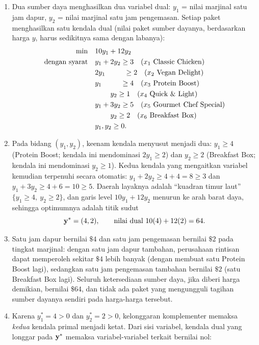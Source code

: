 \begin{enumerate}
\item Dua sumber daya menghasilkan dua variabel dual: $y_1$ = nilai marjinal satu jam dapur, $y_2$ = nilai marjinal satu jam pengemasan. Setiap paket menghasilkan satu kendala dual (nilai paket sumber dayanya, berdasarkan harga $y$, harus sedikitnya sama dengan labanya):
\[
\begin{aligned}
\min \quad & 10y_1 + 12y_2 \\
\st & y_1 + 2y_2 \ge 3 \quad (x_1 \text{ Classic Chicken}) \\
& 2y_1 \phantom{{}+2y_2} \ge 2 \quad (x_2 \text{ Vegan Delight}) \\
& y_1 \phantom{{}+2y_2} \ge 4 \quad (x_3 \text{ Protein Boost}) \\
& \phantom{y_1 + {}} y_2 \ge 1 \quad (x_4 \text{ Quick \& Light}) \\
& y_1 + 3y_2 \ge 5 \quad (x_5 \text{ Gourmet Chef Special}) \\
& \phantom{y_1 + {}} y_2 \ge 2 \quad (x_6 \text{ Breakfast Box}) \\
& y_1, y_2 \ge 0 .
\end{aligned}
\]
\item Pada bidang $(y_1, y_2)$, keenam kendala menyusut menjadi dua: $y_1 \ge 4$ (Protein Boost; kendala ini mendominasi $2y_1 \ge 2$) dan $y_2 \ge 2$ (Breakfast Box; kendala ini mendominasi $y_2 \ge 1$). Kedua kendala yang mengaitkan variabel kemudian terpenuhi secara otomatis: $y_1 + 2y_2 \ge 4 + 4 = 8 \ge 3$ dan $y_1 + 3y_2 \ge 4 + 6 = 10 \ge 5$. Daerah layaknya adalah ``kuadran timur laut'' $\{y_1 \ge 4,\ y_2 \ge 2\}$, dan garis level $10y_1 + 12y_2$ menurun ke arah barat daya, sehingga optimumnya adalah titik sudut
\[
\mathbf{y}^* = (4, 2), \qquad \mbox{nilai dual } 10(4) + 12(2) = 64 .
\]
\item Satu jam dapur bernilai $\$4$ dan satu jam pengemasan bernilai $\$2$ pada tingkat marjinal: dengan satu jam dapur tambahan, perusahaan rintisan dapat memperoleh sekitar $\$4$ lebih banyak (dengan membuat satu Protein Boost lagi), sedangkan satu jam pengemasan tambahan bernilai $\$2$ (satu Breakfast Box lagi). Seluruh ketersediaan sumber daya, jika diberi harga demikian, bernilai $\$64$, dan tidak ada paket yang mengungguli tagihan sumber dayanya sendiri pada harga-harga tersebut.
\item Karena $y_1^* = 4 > 0$ dan $y_2^* = 2 > 0$, kelonggaran komplementer memaksa \emph{kedua} kendala primal menjadi ketat. Dari sisi variabel, kendala dual yang longgar pada $\mathbf{y}^*$ memaksa variabel-variabel terkait bernilai nol:

\end{enumerate}
